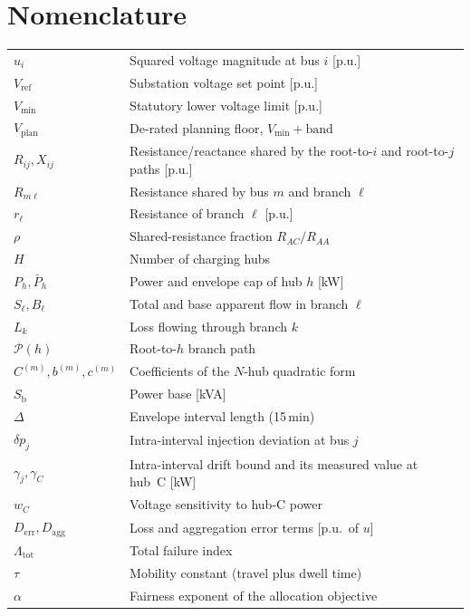 \documentclass[lettersize,journal]{IEEEtran}
\newcommand{\Derr}{D_{\mathrm{err}}}
\newcommand{\Dagg}{D_{\mathrm{agg}}}
\newcommand{\Lamt}{\Lambda_{\mathrm{tot}}}
\newcommand{\Sb}{S_{\mathrm{b}}}
\begin{document}
\section*{Nomenclature}
{\footnotesize
\begin{tabular}{@{}l@{\hspace{6pt}}p{}@{}}
$u_i$ & Squared voltage magnitude at bus $i$ [p.u.]\\
$V_{\mathrm{ref}}$ & Substation voltage set point [p.u.]\\
$V_{\min}$ & Statutory lower voltage limit [p.u.]\\
$V_{\mathrm{plan}}$ & De-rated planning floor, $V_{\min}+\mathrm{band}$\\
$R_{ij},X_{ij}$ & Resistance/reactance shared by the root-to-$i$ and root-to-$j$ paths [p.u.]\\
$R_{m\ell}$ & Resistance shared by bus $m$ and branch $\ell$\\
$r_\ell$ & Resistance of branch $\ell$ [p.u.]\\
$\rho$ & Shared-resistance fraction $R_{AC}/R_{AA}$\\
$H$ & Number of charging hubs\\
$P_h,\bar P_h$ & Power and envelope cap of hub $h$ [kW]\\
$S_\ell,B_\ell$ & Total and base apparent flow in branch $\ell$\\
$L_k$ & Loss flowing through branch $k$\\
$\mathcal{P}(h)$ & Root-to-$h$ branch path\\
$C^{(m)},b^{(m)},c^{(m)}$ & Coefficients of the $N$-hub quadratic form\\
$\Sb$ & Power base [kVA]\\
$\Delta$ & Envelope interval length (15\,min)\\
$\delta p_j$ & Intra-interval injection deviation at bus $j$\\
$\gamma_j,\gamma_C$ & Intra-interval drift bound and its measured value at hub~C [kW]\\
$w_C$ & Voltage sensitivity to hub-C power\\
$\Derr,\Dagg$ & Loss and aggregation error terms [p.u.\ of $u$]\\
$\Lamt$ & Total failure index\\
$\tau$ & Mobility constant (travel plus dwell time)\\
$\alpha$ & Fairness exponent of the allocation objective\\
\end{tabular}}
\end{document}
